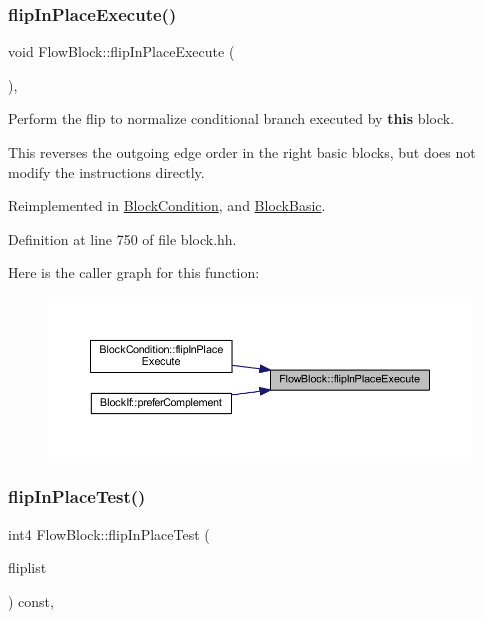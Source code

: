 \subsubsection{\texorpdfstring{flipInPlaceExecute()}{flipInPlaceExecute()}}
{\footnotesize\ttfamily void Flow\+Block\+::flip\+In\+Place\+Execute (\begin{DoxyParamCaption}\item[{void}]{ }\end{DoxyParamCaption})\hspace{0.3cm}{\ttfamily [inline]}, {\ttfamily [virtual]}}



Perform the flip to normalize conditional branch executed by {\bfseries{this}} block. 

This reverses the outgoing edge order in the right basic blocks, but does not modify the instructions directly. 

Reimplemented in \mbox{\hyperlink{class_block_condition_a600c60c9af3b7ad9d7b8f58fa0f7ab5a}{Block\+Condition}}, and \mbox{\hyperlink{class_block_basic_a2949ef4a8d42f16c696fd24ba2ecb58c}{Block\+Basic}}.



Definition at line 750 of file block.\+hh.

Here is the caller graph for this function\+:
\nopagebreak
\begin{figure}[H]
\begin{center}
\leavevmode
\includegraphics[width=350pt]{class_flow_block_a263ec50d30f807a8e1286ac37c6728ce_icgraph}
\end{center}
\end{figure}
\mbox{\label{class_flow_block_a09019e2e4104844e1a698ccf72560bef}} 
\subsubsection{\texorpdfstring{flipInPlaceTest()}{flipInPlaceTest()}}
{\footnotesize\ttfamily int4 Flow\+Block\+::flip\+In\+Place\+Test (\begin{DoxyParamCaption}\item[{vector$<$ \mbox{\hyperlink{class_pcode_op}{Pcode\+Op}} $\ast$ $>$ \&}]{fliplist }\end{DoxyParamCaption}) const\hspace{0.3cm}{\ttfamily [inline]}, {\ttfamily [virtual]}}



